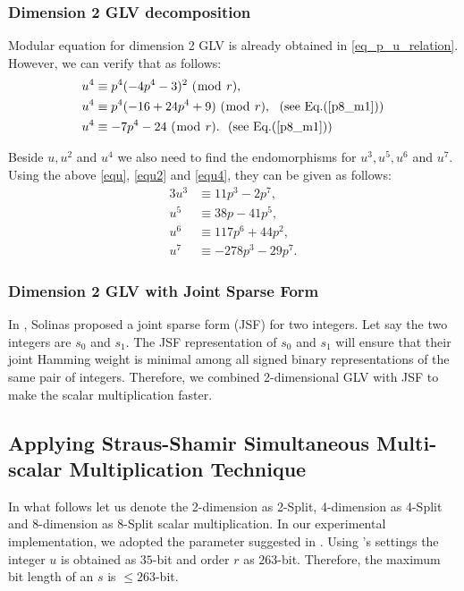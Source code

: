 \subsubsection{Dimension 2 GLV decomposition}
 Modular equation for dimension 2 GLV is already obtained in \eqref{eq_p_u_relation}.
However, we can verify that as follows:
\begin{alignat}{3}
u^4 &\equiv p^4(-4p^4-3)^2~(\bmod~r), \nonumber \\
u^4 &\equiv p^4(-16+24p^4+9)~(\bmod~r),  ~~(\text{see~Eq.}(\ref{p8_m1})) \nonumber \\
u^4 &\equiv -7p^4-24~(\bmod~r). ~~(\text{see~Eq.}(\ref{p8_m1})) \label{equ4}
\end{alignat}

Beside $u, u^2$ and $u^4$ we also need to find the endomorphisms for $u^3, u^5, u^6$ and $u^7$.
Using the above \eqref{equ}, \eqref{equ2} and \eqref{equ4}, they can be given as follows:
\begin{alignat}{3}
 u^3 & \equiv  11p^3-2p^7, \nonumber \\
 u^5 & \equiv 38p -41p^5,\nonumber \\
 u^6 & \equiv  117p^6+44p^2, \nonumber \\
 u^7 & \equiv  -278p^3 -29p^7. \nonumber 
\end{alignat}

\subsubsection{Dimension 2 GLV with Joint Sparse Form}
In \cite{solinas2001JFS}, Solinas proposed a joint sparse form (JSF) for two integers. 
Let say the two integers are $s_0$ and $s_1$. 
The JSF representation of $s_0$ and $s_1$ will ensure that their joint Hamming weight is minimal among all signed binary representations of the same pair of integers. 
Therefore, we combined 2-dimensional GLV with JSF to make the scalar multiplication faster.

\subsection{Applying Straus-Shamir Simultaneous Multi-scalar Multiplication Technique}
In what follows let us denote the 2-dimension as 2-Split, 4-dimension as 4-Split
and 8-dimension as 8-Split scalar multiplication.
In our experimental implementation, we adopted the parameter suggested in \cite{sylvain_new_param}. 
Using \cite{sylvain_new_param}'s settings the integer  $u$ is obtained as $35$-bit and order $r$ as $263$-bit. 
Therefore, the maximum bit length of an $s$ is $\leq 263$-bit.

